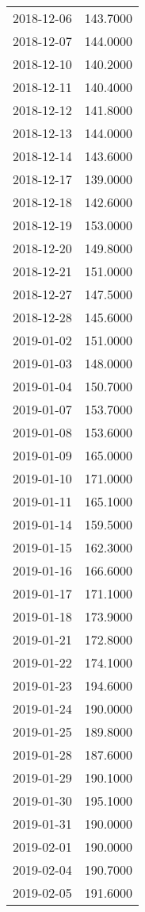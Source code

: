 \begin{tabular}{lr}
2018-12-06 &    143.7000 \\
2018-12-07 &    144.0000 \\
2018-12-10 &    140.2000 \\
2018-12-11 &    140.4000 \\
2018-12-12 &    141.8000 \\
2018-12-13 &    144.0000 \\
2018-12-14 &    143.6000 \\
2018-12-17 &    139.0000 \\
2018-12-18 &    142.6000 \\
2018-12-19 &    153.0000 \\
2018-12-20 &    149.8000 \\
2018-12-21 &    151.0000 \\
2018-12-27 &    147.5000 \\
2018-12-28 &    145.6000 \\
2019-01-02 &    151.0000 \\
2019-01-03 &    148.0000 \\
2019-01-04 &    150.7000 \\
2019-01-07 &    153.7000 \\
2019-01-08 &    153.6000 \\
2019-01-09 &    165.0000 \\
2019-01-10 &    171.0000 \\
2019-01-11 &    165.1000 \\
2019-01-14 &    159.5000 \\
2019-01-15 &    162.3000 \\
2019-01-16 &    166.6000 \\
2019-01-17 &    171.1000 \\
2019-01-18 &    173.9000 \\
2019-01-21 &    172.8000 \\
2019-01-22 &    174.1000 \\
2019-01-23 &    194.6000 \\
2019-01-24 &    190.0000 \\
2019-01-25 &    189.8000 \\
2019-01-28 &    187.6000 \\
2019-01-29 &    190.1000 \\
2019-01-30 &    195.1000 \\
2019-01-31 &    190.0000 \\
2019-02-01 &    190.0000 \\
2019-02-04 &    190.7000 \\
2019-02-05 &    191.6000 \\

\end{tabular}
